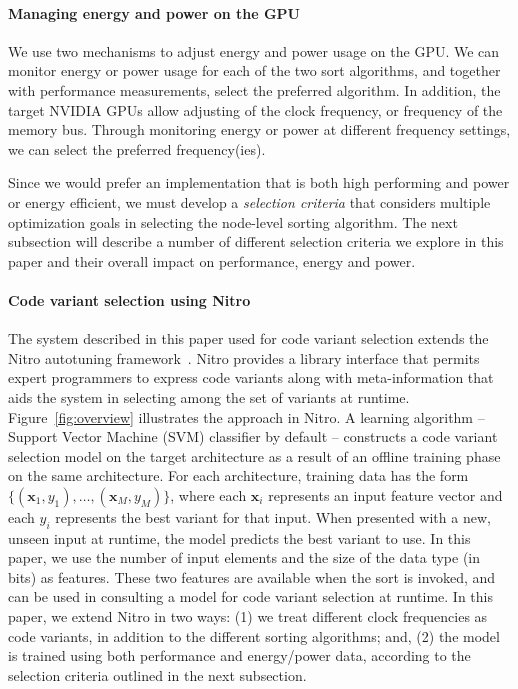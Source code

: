 \paragraph{Managing energy and power on the GPU} 
We use two mechanisms to adjust energy and power usage on the GPU.  
We can monitor energy or power usage for each of the two 
sort algorithms, and together with performance measurements,
select the preferred algorithm.  In addition, the target NVIDIA GPUs
allow adjusting of the clock frequency, or frequency of the memory
bus.  Through monitoring energy or power at different frequency
settings, we can select the preferred frequency(ies).  

Since we would prefer an implementation that is both high performing and
power or energy efficient, we must develop a \emph{selection 
criteria} that considers multiple optimization goals in selecting the
node-level sorting algorithm.
The next subsection will describe
a number of different selection criteria we explore in this paper
and their overall impact on performance, energy and power.

\paragraph{Code variant selection using Nitro}
The system described in this paper used for code variant
selection extends
the Nitro autotuning framework~\cite{muralidharan:2014}.
Nitro provides a library interface that permits expert programmers to
express code variants along with meta-information that aids
the system in selecting among the set of variants at runtime.
Figure~\ref{fig:overview} illustrates the approach in Nitro.  
A learning algorithm -- Support Vector Machine (SVM) classifier by default -- constructs a 
code variant selection
model on the target architecture as a result of an offline training phase on the
 same architecture.
For each architecture, training data has the form
$\{(\mathbf{x}_1, y_1), \hdots, (\mathbf{x}_M, y_M)\}$, where
each $\mathbf{x}_i$ represents an input feature vector and each
$y_i$ represents the best variant for that input.
When presented with a new, unseen input at runtime, the model
predicts the best variant to use. 
In this paper, we use the number of input elements and the size
of the data type (in bits) as features.
These two features are available when the
sort is invoked, and can be used in consulting a model for code
variant selection at runtime.
In this paper, we extend Nitro in two ways: (1) we treat 
different clock frequencies as code variants, in addition to the
different sorting algorithms; and, (2) the model is trained
using both performance and energy/power data, according to the 
selection criteria outlined in the next subsection.

